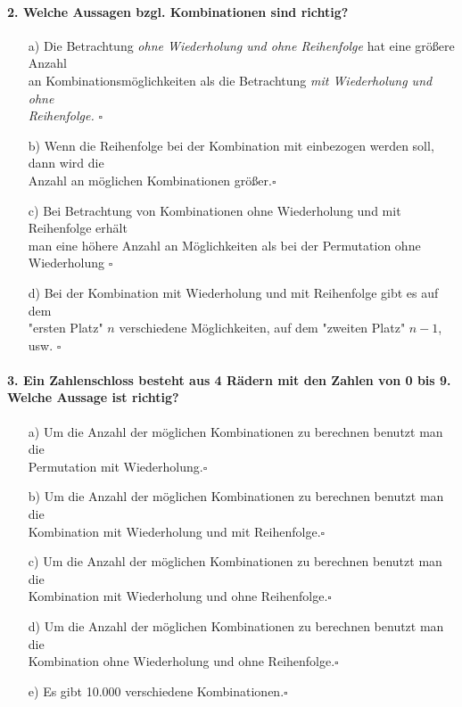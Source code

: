 \documentclass[a4paper]{article}
\begin{document}
\paragraph{2. Welche Aussagen bzgl. Kombinationen sind richtig?}
\begin{itemize}
    \item [a)] Die Betrachtung \textit{ohne Wiederholung und ohne Reihenfolge} hat eine größere Anzahl \\ an Kombinationsmöglichkeiten als die Betrachtung \textit{mit Wiederholung und ohne \\Reihenfolge.} \hfill $\square$
    \item[b)] Wenn die Reihenfolge bei der Kombination mit einbezogen werden soll, dann wird die \\Anzahl an möglichen Kombinationen größer.\hfill $\square$
    \item[c)] Bei Betrachtung von Kombinationen ohne Wiederholung und mit Reihenfolge erhält\\ man eine höhere Anzahl an Möglichkeiten als bei der Permutation ohne Wiederholung \hfill $\square$
    \item[d)] Bei der Kombination mit Wiederholung und mit Reihenfolge gibt es auf dem \\"ersten Platz" $n$ verschiedene Möglichkeiten, auf dem "zweiten Platz" $n-1$, usw. \hfill $\square$
\end{itemize}

\paragraph{3. Ein Zahlenschloss besteht aus 4 Rädern mit den Zahlen von 0 bis 9. Welche Aussage ist richtig?}
\begin{itemize}
    \item[a)] Um die Anzahl der möglichen Kombinationen zu berechnen benutzt man die\\ Permutation mit Wiederholung.\hfill $\square$
    \item[b)] Um die Anzahl der möglichen Kombinationen zu berechnen benutzt man die\\ Kombination mit Wiederholung und mit Reihenfolge.\hfill $\square$
    \item[c)] Um die Anzahl der möglichen Kombinationen zu berechnen benutzt man die\\ Kombination mit Wiederholung und ohne Reihenfolge.\hfill $\square$
    \item[d)] Um die Anzahl der möglichen Kombinationen zu berechnen benutzt man die\\ Kombination ohne Wiederholung und ohne Reihenfolge.\hfill $\square$
    \item[e)] Es gibt 10.000 verschiedene Kombinationen.\hfill $\square$
\end{itemize}
\end{document}
